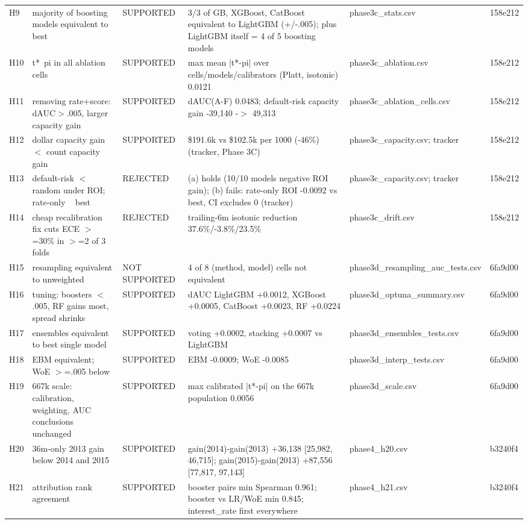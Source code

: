 \begin{table}[t]
\begin{tabular}{lp{5.2cm}p{5.2cm}p{5.2cm}lp{5.2cm}}
H9 & majority of boosting models equivalent to best & SUPPORTED & 3/3 of GB, XGBoost, CatBoost equivalent to LightGBM (+/-.005); plus LightGBM itself = 4 of 5 boosting models & phase3c\_stats.csv & 158e212 \\
H10 & t*~pi in all ablation cells & SUPPORTED & max mean |t*-pi| over cells/models/calibrators (Platt, isotonic) 0.0121 & phase3c\_ablation.csv & 158e212 \\
H11 & removing rate+score: dAUC$>$.005, larger capacity gain & SUPPORTED & dAUC(A-F) 0.0483; default-risk capacity gain -39,140 -$>$ 49,313 & phase3c\_ablation\_cells.csv & 158e212 \\
H12 & dollar capacity gain $<$ count capacity gain & SUPPORTED & \$191.6k vs \$102.5k per 1000 (-46\%) (tracker, Phase 3C) & phase3c\_capacity.csv; tracker & 158e212 \\
H13 & default-risk $<$ random under ROI; rate-only ~ best & REJECTED & (a) holds (10/10 models negative ROI gain); (b) fails: rate-only ROI -0.0092 vs best, CI excludes 0 (tracker) & phase3c\_capacity.csv; tracker & 158e212 \\
H14 & cheap recalibration fix cuts ECE $>$=30\% in $>$=2 of 3 folds & REJECTED & trailing-6m isotonic reduction 37.6\%/-3.8\%/23.5\% & phase3c\_drift.csv & 158e212 \\
H15 & resampling equivalent to unweighted & NOT SUPPORTED & 4 of 8 (method, model) cells not equivalent & phase3d\_resampling\_auc\_tests.csv & 6fa9d00 \\
H16 & tuning: boosters $<$.005, RF gains most, spread shrinks & SUPPORTED & dAUC LightGBM +0.0012, XGBoost +0.0005, CatBoost +0.0023, RF +0.0224 & phase3d\_optuna\_summary.csv & 6fa9d00 \\
H17 & ensembles equivalent to best single model & SUPPORTED & voting +0.0002, stacking +0.0007 vs LightGBM & phase3d\_ensembles\_tests.csv & 6fa9d00 \\
H18 & EBM equivalent; WoE $>$=.005 below & SUPPORTED & EBM -0.0009; WoE -0.0085 & phase3d\_interp\_tests.csv & 6fa9d00 \\
H19 & 667k scale: calibration, weighting, AUC conclusions unchanged & SUPPORTED & max calibrated |t*-pi| on the 667k population 0.0056 & phase3d\_scale.csv & 6fa9d00 \\
H20 & 36m-only 2013 gain below 2014 and 2015 & SUPPORTED & gain(2014)-gain(2013) +36,138 [25,982, 46,715]; gain(2015)-gain(2013) +87,556 [77,817, 97,143] & phase4\_h20.csv & b3240f4 \\
H21 & attribution rank agreement & SUPPORTED & booster pairs min Spearman 0.961; booster vs LR/WoE min 0.845; interest\_rate first everywhere & phase4\_h21.csv & b3240f4 \\

\end{tabular}
\end{table}
